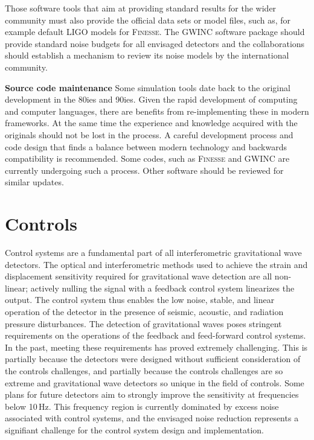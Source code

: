 Those software tools that aim at providing standard results for the wider community must also provide the official data sets or model files, such as, for example default LIGO models for \textsc{Finesse}. The GWINC software package should provide standard noise budgets for all envisaged detectors and the
collaborations should establish a mechanism to review its noise models by the international community.

\textbf{Source code maintenance}
Some simulation tools date back to the original development in the 80ies and 90ies. Given the rapid development of computing and computer languages,  there are benefits from re-implementing these in modern frameworks. At the same time the experience and knowledge acquired with the originals should not be lost in the process. A careful development process and code design that finds a balance between modern technology and backwards compatibility
is recommended. Some codes, such as \textsc{Finesse} and GWINC are currently undergoing such a process. Other software should be reviewed for similar updates.

\section{Controls}
\label{sec:Controls}
Control systems are a fundamental part of all interferometric gravitational wave detectors. The optical and interferometric methods used to achieve the strain and displacement sensitivity required for gravitational wave detection are all non-linear; actively nulling the signal with a feedback control system linearizes the output. The control system thus enables the low noise, stable, and linear operation of the detector in the presence of seismic, acoustic, and radiation pressure disturbances.
The detection of gravitational waves poses stringent requirements on the operations of the feedback and feed-forward control systems.
In the past, meeting these requirements has proved extremely challenging.
This is partially because the detectors were designed without sufficient consideration of the controls challenges, and partially because the controls challenges are so extreme and gravitational wave detectors so unique in the field of controls.
Some plans for future detectors aim to strongly improve the sensitivity at frequencies below 10\,Hz. This frequency region is currently dominated by excess noise associated with control systems, and the envisaged noise reduction represents a signifiant challenge for the control system design and implementation.

